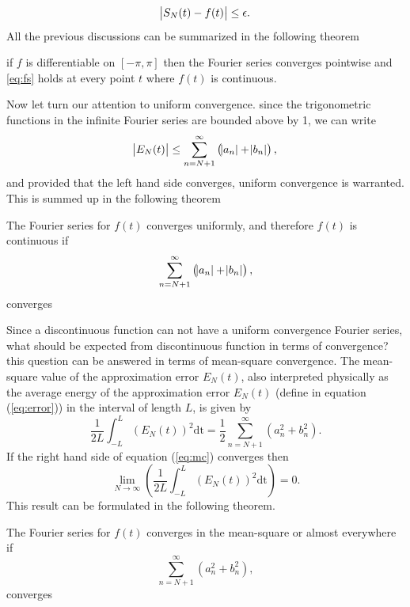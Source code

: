 \documentclass[../Main/thesis.tex]{subfiles}
\begin{document}
\begin{equation}
\abs{S_{N}(t)-f(t)} \leq \epsilon.
\end{equation}
All the previous discussions can be summarized in the following theorem
\begin{theorem}
	if $f$ is differentiable on $[-\pi, \pi]$ then the Fourier series converges pointwise
	and \ref{eq:fs} holds at every point $t$ where $f(t)$ is continuous.
\end{theorem}
Now let turn our attention to uniform convergence.
since the trigonometric functions in the infinite Fourier series are bounded above by 1, we can write 
\begin{equation}
\abs{E_{N}(t)} \leq \sum_{n = N+1}^{\infty} \left(\abs{a_{n}} + \abs{b_{n}}\right),
\end{equation} 
and provided that the left hand side converges, uniform convergence is warranted. This is summed up in the following theorem
\begin{theorem}
	The Fourier series for $f(t)$ converges uniformly, and therefore $f(t)$ is continuous if
	 \begin{equation}
	  \sum_{n = N+1}^{\infty} \left(\abs{a_{n}} + \abs{b_{n}}\right),
	 \end{equation}
	 converges
\end{theorem}
Since a discontinuous function can not have a uniform convergence Fourier series, what should be expected from discontinuous function in terms of convergence? this question can be answered in terms of mean-square convergence.
The mean-square value of the approximation error $E_{N}(t)$, also interpreted physically as the average energy of the approximation error $E_{N}(t)$ (define in equation (\ref{eq:error})) in the interval of length $L$, is given by 
\begin{equation}\label{eq:mc}
	\frac{1}{2L}\int_{-L}^{L}\left(E_{N}(t)\right)^{2}\mathrm{dt} = \frac{1}{2}\sum_{n=N+1}^{\infty}\left(a_{n}^{2} + b_{n}^{2}\right).
\end{equation}
If the right hand side of equation (\ref{eq:mc}) converges then 
\begin{equation}
	\lim_{N\rightarrow \infty}\left( \frac{1}{2L}\int_{-L}^{L}\left(E_{N}(t)\right)^{2}\mathrm{dt}  \right) = 0.
\end{equation}
This result can be formulated in the following theorem.
\begin{theorem}\label{thm:msc}
	The Fourier series for $f(t)$ converges in the mean-square or almost everywhere if 
	\begin{equation}
	\sum_{n=N+1}^{\infty}\left(a_{n}^{2} + b_{n}^{2}\right),
	\end{equation}
	converges
\end{theorem}
\end{document}
